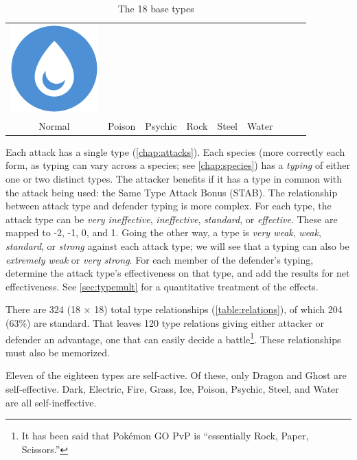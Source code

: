 \begin{table}[h!]
\begin{center}
\begin{tabular}{c c c c c c c c c}
  \includegraphics[scale=.25]{images/water.png} \\
  Normal & Poison & Psychic & Rock & Steel & Water \\
\end{tabular}
\end{center}
\caption{The 18 base types}
\end{table}

Each attack has a single type (\autoref{chap:attacks}).
Each species (more correctly each form, as typing can vary across a species; see \autoref{chap:species})
  has a \textit{typing} of either one or two distinct types.
The attacker benefits if it has a type in common with the attack being used:
  the Same Type Attack Bonus (STAB).
The relationship between attack type and defender typing is more complex.
For each type, the attack type can be \textit{very ineffective},
  \textit{ineffective}, \textit{standard}, or \textit{effective}.
These are mapped to -2, -1, 0, and 1.
Going the other way, a type is \textit{very weak}, \textit{weak},
  \textit{standard}, or \textit{strong} against each attack type;
  we will see that a typing can also be \textit{extremely weak} or
  \textit{very strong}.
For each member of the defender's typing, determine the attack type's effectiveness
  on that type, and add the results for net effectiveness.
See \autoref{sec:typemult} for a quantitative treatment of the effects.

There are 324 (18 × 18) total type relationships (\autoref{table:relations}),
  of which 204 (63\%) are standard.
That leaves 120 type relations giving either attacker or defender an advantage,
  one that can easily decide a battle\footnote{It has been said that Pokémon GO PvP is ``essentially Rock, Paper, Scissors.''}.
These relationships must also be memorized.



Eleven of the eighteen types are self-active.
Of these, only Dragon and Ghost are self-effective.
Dark, Electric, Fire, Grass, Ice, Poison, Psychic, Steel, and Water are all self-ineffective.%

